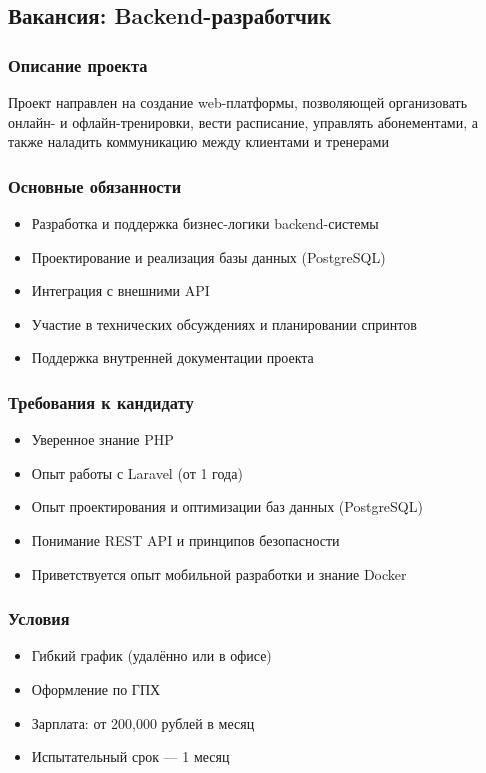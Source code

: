 \documentclass[14pt, russian]{matmex-diploma-custom}
\begin{document}
    \subsection{Вакансия: Backend-разработчик}

    \subsubsection{Описание проекта}
    Проект направлен на создание web-платформы, позволяющей организовать онлайн- и офлайн-тренировки, вести расписание, управлять абонементами, а также наладить коммуникацию между клиентами и тренерами

    \subsubsection{Основные обязанности}
    \begin{itemize}
        \item Разработка и поддержка бизнес-логики backend-системы
        \item Проектирование и реализация базы данных (PostgreSQL)
        \item Интеграция с внешними API
        \item Участие в технических обсуждениях и планировании спринтов
        \item Поддержка внутренней документации проекта
    \end{itemize}

    \subsubsection{Требования к кандидату}
    \begin{itemize}
        \item Уверенное знание PHP
        \item Опыт работы с Laravel (от 1 года)
        \item Опыт проектирования и оптимизации баз данных (PostgreSQL)
        \item Понимание REST API и принципов безопасности
        \item Приветствуется опыт мобильной разработки и знание Docker
    \end{itemize}

    \subsubsection{Условия}
    \begin{itemize}
        \item Гибкий график (удалённо или в офисе)
        \item Оформление по ГПХ
        \item Зарплата: от 200,000 рублей в месяц
        \item Испытательный срок — 1 месяц
    \end{itemize}
\end{document}
